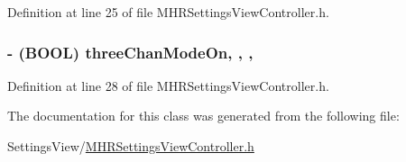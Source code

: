 Definition at line 25 of file M\+H\+R\+Settings\+View\+Controller.\+h.

\hypertarget{interface_m_h_r_settings_view_controller_add55937fcb10a424e5f651d372b4b6a9}{
\subsubsection[{three\+Chan\+Mode\+On}]{\setlength{\rightskip}{0pt plus 5cm}-\/ (B\+O\+O\+L) three\+Chan\+Mode\+On\hspace{0.3cm}{\ttfamily [read]}, {\ttfamily [write]}, {\ttfamily [nonatomic]}, {\ttfamily [assign]}}}\label{interface_m_h_r_settings_view_controller_add55937fcb10a424e5f651d372b4b6a9}


Definition at line 28 of file M\+H\+R\+Settings\+View\+Controller.\+h.



The documentation for this class was generated from the following file\+:\begin{DoxyCompactItemize}
\item 
Settings\+View/\hyperlink{_m_h_r_settings_view_controller_8h}{M\+H\+R\+Settings\+View\+Controller.\+h}\end{DoxyCompactItemize}

